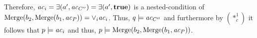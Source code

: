 \begin{description}
\begin{description}
Therefore, $\mathit{ac}_i=\exists(a', \mathit{ac}_{C''}) = \exists(a', \textbf{true})$ is a nested-condition of $\mathrm{Merge}(b_2,\mathrm{Merge}(b_1,\mathit{ac}_P))=\vee_{i}\mathit{ac}_i$.
Thus, $q \models \mathit{ac}_{C''}$ and furthermore by $(*^1_c)$ it follows that $p \models \mathit{ac}_i$ and thus, $p \models \mathrm{Merge}(b_2,\mathrm{Merge}(b_1,\mathit{ac}_P))$.
\end{description}


\end{description}
